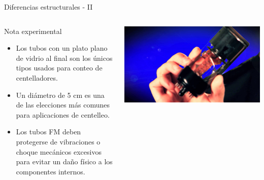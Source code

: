\documentclass[a4paper,10pt]{beamer}
\begin{document}
\begin{frame}{Diferencias estructurales - II}
\begin{columns}[c]
\column{2in}
 \begin{exampleblock}{Nota experimental}
  \begin{itemize}[<+->]
   \item \begin{justify}
          Los tubos con un plato plano de vidrio al final son los únicos tipos
	  usados para conteo de centelladores.
         \end{justify}
   \item \begin{justify}
          Un diámetro de 5 cm es una de las elecciones más comunes para aplicaciones 
          de centelleo.
         \end{justify}
   \item \begin{justify}
          Los tubos FM deben protegerse de vibraciones o choque mecánicos excesivos 
          para evitar un daño físico a los componentes internos.
         \end{justify}
  \end{itemize}
 \end{exampleblock}

  \column{2in}
  
  \begin{center}
 \includegraphics[scale=0.08]{fig22}
 \end{center}
  
  \end{columns}
\end{frame}
\end{document}
